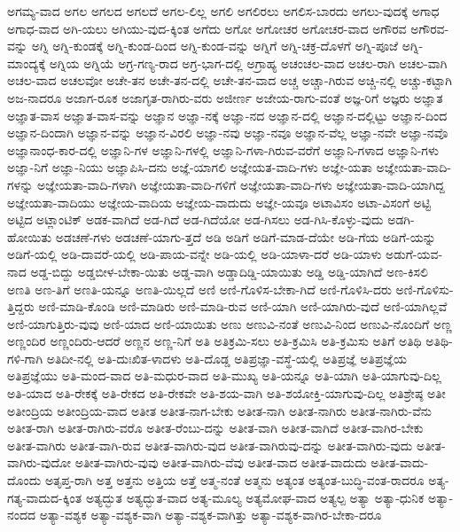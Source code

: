 {ಅಗಮ್ಯ-ವಾದ
ಅಗಲ
ಅಗಲದ
ಅಗಲದೆ
ಅಗಲ-ಲಿಲ್ಲ
ಅಗಲಿ
ಅಗಲಿರಲು
ಅಗಲಿಸ-ಬಾರದು
ಅಗಲು-ವುದಕ್ಕೆ
ಅಗಾಧ
ಅಗಾಧ-ವಾದ
ಅಗಿ-ಯಲು
ಅಗಿಯು-ವುದ-ಕ್ಕಿಂತ
ಅಗೆದು
ಅಗೋ
ಅಗೋಚರ
ಅಗೋಚರ-ವಾದ
ಅಗೌರವ
ಅಗೌರವ-ವನ್ನು
ಅಗ್ನಿ
ಅಗ್ನಿ-ಕುಂಡಕ್ಕೆ
ಅಗ್ನಿ-ಕುಂಡ-ದಿಂದ
ಅಗ್ನಿ-ಕುಂಡ-ವನ್ನು
ಅಗ್ನಿಗೆ
ಅಗ್ನಿ-ಚಕ್ರ-ದೊಳಗೆ
ಅಗ್ನಿ-ಪೂಜೆ
ಅಗ್ನಿ-ಮಾಂದ್ಯಕ್ಕೆ
ಅಗ್ನಿಯ
ಅಗ್ನಿಯೆ
ಅಗ್ರ-ಗಣ್ಯ-ರಾದ
ಅಗ್ರ-ಭಾಗ-ದಲ್ಲಿ
ಅಗ್ರಾಹ್ಯ
ಅಚಂಚಲ-ವಾದ
ಅಚಲ-ರಾಗಿ
ಅಚಲ-ವಾಗಿ
ಅಚಲ-ವಾದ
ಅಚಲವೋ
ಅಚೇ-ತನ
ಅಚೇ-ತನ-ದಲ್ಲಿ
ಅಚೇ-ತನ-ವಾದ
ಅಚ್ಚ
ಅಚ್ಚಾ-ಗಿರುವ
ಅಚ್ಚಿ-ನಲ್ಲಿ
ಅಚ್ಚು-ಕಟ್ಟಾಗಿ
ಅಜ-ನಾದರೂ
ಅಜಾಗ-ರೂಕ
ಅಜಾಗೃತ-ರಾಗಿರು-ವರು
ಅಜೀರ್ಣ
ಅಜೇಯ-ರಾಗು-ವಂತೆ
ಅಜ್ಞ-ರಿಗೆ
ಅಜ್ಞರು
ಅಜ್ಞಾತ
ಅಜ್ಞಾತ-ವಾಸ
ಅಜ್ಞಾತ-ವಾಸ-ವನ್ನು
ಅಜ್ಞಾನ
ಅಜ್ಞಾ-ನಕ್ಕೆ
ಅಜ್ಞಾ-ನದ
ಅಜ್ಞಾನ-ದಲ್ಲಿ
ಅಜ್ಞಾನ-ದಲ್ಲಿಟ್ಟು
ಅಜ್ಞಾನ-ದಿಂದ
ಅಜ್ಞಾನ-ದಿಂದಾಗಿ
ಅಜ್ಞಾನ-ವನ್ನು
ಅಜ್ಞಾನ-ವಿರಲಿ
ಅಜ್ಞಾ-ನವು
ಅಜ್ಞಾ-ನವೂ
ಅಜ್ಞಾನ-ವೆಲ್ಲ
ಅಜ್ಞಾ-ನವೇ
ಅಜ್ಞಾ-ನವೊ
ಅಜ್ಞಾನಾಂಧ-ಕಾರ-ದಲ್ಲಿ
ಅಜ್ಞಾನಿ-ಗಳ
ಅಜ್ಞಾನಿ-ಗಳಲ್ಲಿ
ಅಜ್ಞಾನಿ-ಗಳಾ-ಗಿರುವ-ವರೆಗೆ
ಅಜ್ಞಾನಿ-ಗಳಾದ
ಅಜ್ಞಾನಿ-ಗಳು
ಅಜ್ಞಾ-ನಿಗೆ
ಅಜ್ಞಾ-ನಿಯು
ಅಜ್ಞಾಪಿಸಿ-ದನು
ಅಜ್ಞೆ-ಯಾಗಲಿ
ಅಜ್ಞೇಯತ-ವಾದಿ-ಗಳು
ಅಜ್ಞೇ-ಯತಾ
ಅಜ್ಞೇಯತಾ-ವಾದಿ-ಗಳನ್ನು
ಅಜ್ಞೇಯತಾ-ವಾದಿ-ಗಳಾಗಿ
ಅಜ್ಞೇಯತಾ-ವಾದಿ-ಗಳಿಗೆ
ಅಜ್ಞೇಯತಾ-ವಾದಿ-ಗಳು
ಅಜ್ಞೇಯತಾ-ವಾದಿ-ಯಾಗಿದ್ದ
ಅಜ್ಞೇಯತಾ-ವಾದಿಯು
ಅಜ್ಞೇಯ-ವಾದಿಯ
ಅಜ್ಞೇಯ-ವಾದುದು
ಅಜ್ಞೇ-ಯವೂ
ಅಟಾವಿಸಂ
ಅಟಾ-ವಿಸಂಗೆ
ಅಟ್ಟಿ
ಅಟ್ಟಿದ
ಅಟ್ಲಾಂಟಿಕ್
ಅಡಕ-ವಾಗಿದೆ
ಅಡ-ಗಿದೆ
ಅಡ-ಗಿದೆಯೋ
ಅಡ-ಗಿಸಲು
ಅಡ-ಗಿಸಿ-ಕೊಳ್ಳು-ವುದು
ಅಡಗಿ-ಹೋಯಿತು
ಅಡಚಣೆ-ಗಳು
ಅಡಚಣೆ-ಯಾಗು-ತ್ತದೆ
ಅಡಿ
ಅಡಿಗೆ
ಅಡಿಗೆ-ಮಾಡ-ದೆಯೇ
ಅಡಿ-ಗೆಯ
ಅಡಿಗೆ-ಯನ್ನು
ಅಡಿಗೆ-ಯಲ್ಲಿ
ಅಡಿ-ದಾವರೆ-ಯಲ್ಲಿ
ಅಡಿ-ಪಾಯ-ವನ್ನೇ
ಅಡಿ-ಯಲ್ಲಿ
ಅಡಿ-ಯಾಳಾ-ದರೆ
ಅಡಿ-ಯಾಳು
ಅಡುಗೆ-ಯವ-ನಾದ
ಅಡ್ಡ-ಬಿದ್ದು
ಅಡ್ಡಬೀಳ-ಬೇಕಾ-ಯಿತು
ಅಡ್ಡ-ವಾಗಿ
ಅಡ್ಡಾದಿಡ್ಡಿ-ಯಾಯಿತು
ಅಡ್ಡಿ
ಅಡ್ಡಿ-ಯಾಗಿದೆ
ಅಣ-ಕಿಸಲಿ
ಅಣತಿ
ಅಣ-ತಿಗೆ
ಅಣತಿ-ಯನ್ನೂ
ಅಣತಿ-ಯಿಲ್ಲದೆ
ಅಣಿ
ಅಣಿ-ಗೊಳಿಸ-ಬೇಕಾ-ಗಿದೆ
ಅಣಿ-ಗೊಳಿಸಿ-ದರು
ಅಣಿ-ಗೊಳಿಸು-ತ್ತಿದ್ದರು
ಅಣಿ-ಮಾಡಿ-ಕೊಂಡಿ
ಅಣಿ-ಮಾಡಿರು
ಅಣಿ-ಮಾಡಿ-ರುವ
ಅಣಿ-ಯಾಗಿ
ಅಣಿ-ಯಾಗಿರು-ವುದೆ
ಅಣಿ-ಯಾಗಿಲ್ಲವೆ
ಅಣಿ-ಯಾಗುತ್ತಿರು-ವುವು
ಅಣಿ-ಯಾದ
ಅಣಿ-ಯಾಯಿತು
ಅಣು
ಅಣುವಿ-ನಂತೆ
ಅಣುವಿ-ನಿಂದ
ಅಣುವಿ-ನೊಂದಿಗೆ
ಅಣ್ಣ
ಅಣ್ಣಂದಿರ
ಅಣ್ಣಂದಿರು-ಆದರೆ
ಅಣ್ಣನ
ಅಣ್ಣ-ನಿಗೆ
ಅತಿ
ಅತಿಕ್ರಮಿ-ಸಲು
ಅತಿ-ಕ್ರಮಿಸಿ
ಅತಿ-ಕ್ರಮಿಸು
ಅತಿಗೆ
ಅತಿಥಿ
ಅತಿಥಿ-ಗಳಿ-ಗಾಗಿ
ಅತಿದೀ-ನಲ್ಲಿ
ಅತಿ-ದುಃಖಿತ-ಳಾದಳು
ಅತಿ-ದೊಡ್ಡ
ಅತಿಪ್ರಜ್ಞಾ-ವಸ್ಥೆ-ಯಲ್ಲಿ
ಅತಿಪ್ರಜ್ಞೆ
ಅತಿಪ್ರಜ್ಞೆಯ
ಅತಿಪ್ರಜ್ಞೆಯು
ಅತಿ-ಮಂದ-ವಾದ
ಅತಿ-ಮಧುರ-ವಾದ
ಅತಿ-ಮುಖ್ಯ
ಅತಿ-ಯನ್ನೂ
ಅತಿ-ಯಾಗಿ
ಅತಿ-ಯಾಗುವು-ದಿಲ್ಲ
ಅತಿ-ಯಾದ
ಅತಿ-ರೇಕಕ್ಕೆ
ಅತಿ-ರೇಕದ
ಅತಿ-ರೇಕವೇ
ಅತಿ-ಶಯ-ವಾಗಿ
ಅತಿ-ಶಯೋಕ್ತಿ-ಯಾಗುವು-ದಿಲ್ಲ
ಅತಿಶ್ರೇಷ್ಠ
ಅತೀ
ಅತೀಂದ್ರಿಯ
ಅತೀಂದ್ರಿಯ-ವಾದ
ಅತೀತ
ಅತೀತ-ನಾಗ-ಬೇಕು
ಅತೀತ-ನಾಗಿ
ಅತೀತ-ನಾಗಿರು
ಅತೀತ-ನಾಗಿರು-ವೆನು
ಅತೀತ-ರಾಗಿ
ಅತೀತ-ರಾಗಿರು-ವರೊ
ಅತೀತ-ರೆಂಬು-ದನ್ನು
ಅತೀತ-ವಾಗಿ
ಅತೀತ-ವಾಗಿದೆ
ಅತೀತ-ವಾಗಿರ-ಬೇಕು
ಅತೀತ-ವಾಗಿರು
ಅತೀತ-ವಾಗಿ-ರುವ
ಅತೀತ-ವಾಗಿರು-ವುದ
ಅತೀತ-ವಾಗಿರುವು-ದನ್ನು
ಅತೀತ-ವಾಗಿರು-ವುದು
ಅತೀತ-ವಾಗಿರು-ವುದೋ
ಅತೀತ-ವಾಗಿರು-ವುವು
ಅತೀತ-ವಾಗಿರು-ವೆವು
ಅತೀತ-ವಾದ
ಅತೀತ-ವಾದುದು
ಅತೀತ-ವಾದು-ದೊಂದು
ಅತೃಪ್ತ-ರಾಗಿ
ಅತ್ತ
ಅತ್ತನು
ಅತ್ತಿಯ
ಅತ್ತೆ
ಅತ್ಮ-ನಂತೆ
ಅತ್ಮನು
ಅತ್ಯಂತ
ಅತ್ಯಂತ-ಬುದ್ಧಿ-ವಂತ-ರಾದರೂ
ಅತ್ಯ-ಗತ್ಯ-ವಾದುದ-ಕ್ಕಿಂತ
ಅತ್ಯದ್ಭುತ
ಅತ್ಯದ್ಭುತ-ವಾದ
ಅತ್ಯ-ಮೂಲ್ಯ
ಅತ್ಯಮೋಘ-ವಾದ
ಅತ್ಯಲ್ಪ
ಅತ್ಯಾ
ಅತ್ಯಾ-ಧುನಿಕ
ಅತ್ಯಾ-ನಂದದ
ಅತ್ಯಾ-ವಶ್ಯಕ
ಅತ್ಯಾ-ವಶ್ಯಕ-ವಾಗಿ
ಅತ್ಯಾ-ವಶ್ಯಕ-ವಾಗಿತ್ತು
ಅತ್ಯಾ-ವಶ್ಯಕ-ವಾಗಿರ-ಬೇಕಾ-ದರೂ
}
